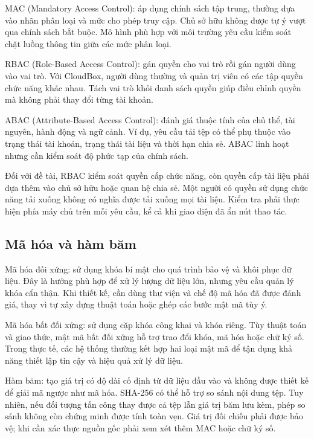 MAC (Mandatory Access Control): áp dụng chính sách tập trung, thường dựa vào nhãn phân loại và mức cho phép truy cập. Chủ sở hữu không được tự ý vượt qua chính sách bắt buộc. Mô hình phù hợp với môi trường yêu cầu kiểm soát chặt luồng thông tin giữa các mức phân loại.

RBAC (Role-Based Access Control): gán quyền cho vai trò rồi gán người dùng vào vai trò. Với CloudBox, người dùng thường và quản trị viên có các tập quyền chức năng khác nhau. Tách vai trò khỏi danh sách quyền giúp điều chỉnh quyền mà không phải thay đổi từng tài khoản.

ABAC (Attribute-Based Access Control): đánh giá thuộc tính của chủ thể, tài nguyên, hành động và ngữ cảnh. Ví dụ, yêu cầu tải tệp có thể phụ thuộc vào trạng thái tài khoản, trạng thái tài liệu và thời hạn chia sẻ. ABAC linh hoạt nhưng cần kiểm soát độ phức tạp của chính sách.

Đối với đề tài, RBAC kiểm soát quyền cấp chức năng, còn quyền cấp tài liệu phải dựa thêm vào chủ sở hữu hoặc quan hệ chia sẻ. Một người có quyền sử dụng chức năng tải xuống không có nghĩa được tải xuống mọi tài liệu. Kiểm tra phải thực hiện phía máy chủ trên mỗi yêu cầu, kể cả khi giao diện đã ẩn nút thao tác.\cite{authorization}

\subsection{Mã hóa và hàm băm}
Mã hóa đối xứng: sử dụng khóa bí mật cho quá trình bảo vệ và khôi phục dữ liệu. Đây là hướng phù hợp để xử lý lượng dữ liệu lớn, nhưng yêu cầu quản lý khóa cẩn thận. Khi thiết kế, cần dùng thư viện và chế độ mã hóa đã được đánh giá, thay vì tự xây dựng thuật toán hoặc ghép các bước mật mã tùy ý.

Mã hóa bất đối xứng: sử dụng cặp khóa công khai và khóa riêng. Tùy thuật toán và giao thức, mật mã bất đối xứng hỗ trợ trao đổi khóa, mã hóa hoặc chữ ký số. Trong thực tế, các hệ thống thường kết hợp hai loại mật mã để tận dụng khả năng thiết lập tin cậy và hiệu quả xử lý dữ liệu.

Hàm băm: tạo giá trị có độ dài cố định từ dữ liệu đầu vào và không được thiết kế để giải mã ngược như mã hóa. SHA-256 có thể hỗ trợ so sánh nội dung tệp. Tuy nhiên, nếu đối tượng tấn công thay được cả tệp lẫn giá trị băm lưu kèm, phép so sánh không còn chứng minh được tính toàn vẹn. Giá trị đối chiếu phải được bảo vệ; khi cần xác thực nguồn gốc phải xem xét thêm MAC hoặc chữ ký số.

